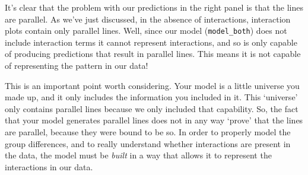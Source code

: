 \documentclass[
]{book}
\begin{document}
It's clear that the problem with our predictions in the right panel is that the lines are parallel. As we've just discussed, in the absence of interactions, interaction plots contain only parallel lines. Well, since our model (\texttt{model\_both}) does not include interaction terms it cannot represent interactions, and so is only capable of producing predictions that result in parallel lines. This means it is not capable of representing the pattern in our data!

This is an important point worth considering. Your model is a little universe you made up, and it only includes the information you included in it. This `universe' only contains parallel lines because we only included that capability. So, the fact that your model generates parallel lines does not in any way `prove' that the lines are parallel, because they were bound to be so. In order to properly model the group differences, and to really understand whether interactions are present in the data, the model must be \emph{built} in a way that allows it to represent the interactions in our data.
\end{document}
